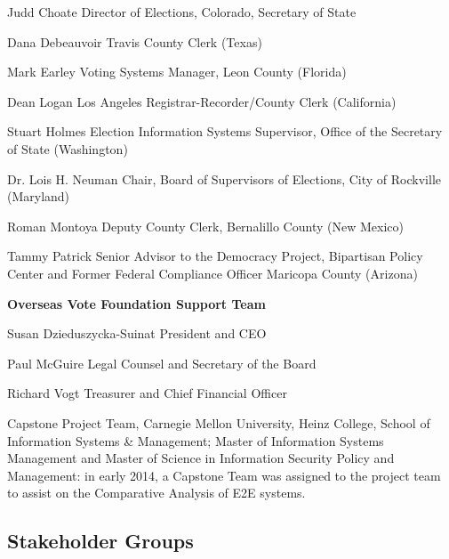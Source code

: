 Judd Choate
Director of Elections, Colorado, Secretary of State

Dana Debeauvoir
Travis County Clerk (Texas)
 
Mark Earley
Voting Systems Manager, Leon County (Florida)
 
Dean Logan
Los Angeles Registrar-Recorder/County Clerk (California)

Stuart Holmes
Election Information Systems Supervisor, Office of the Secretary of State (Washington)
 
Dr. Lois H. Neuman
Chair, Board of Supervisors of Elections, City of Rockville (Maryland)
 
Roman Montoya
Deputy County Clerk, Bernalillo County (New Mexico)
 
Tammy Patrick
Senior Advisor to the Democracy Project, Bipartisan Policy Center and Former Federal Compliance Officer Maricopa County (Arizona)
 
\textbf{Overseas Vote Foundation Support Team}

Susan Dzieduszycka-Suinat
President and CEO
 
Paul McGuire
Legal Counsel and Secretary of the Board
 
Richard Vogt
Treasurer and Chief Financial Officer

Capstone Project Team, Carnegie Mellon University, Heinz College,
School of Information Systems \& Management; Master of Information
Systems Management and Master of Science in Information Security
Policy and Management: in early 2014, a Capstone Team was assigned to
the project team to assist on the Comparative Analysis of E2E systems.

\subsection{Stakeholder Groups}
\label{sec:stakeholder-groups}

